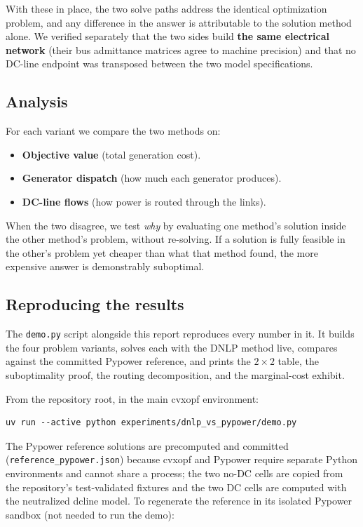 \documentclass[11pt]{article}
\begin{document}
With these in place, the two solve paths address the identical optimization
problem, and any difference in the answer is attributable to the solution method
alone. We verified separately that the two sides build \textbf{the same
electrical network} (their bus admittance matrices agree to machine precision)
and that no DC-line endpoint was transposed between the two model
specifications.

\subsection{Analysis}

For each variant we compare the two methods on:

\begin{itemize}
  \item \textbf{Objective value} (total generation cost).
  \item \textbf{Generator dispatch} (how much each generator produces).
  \item \textbf{DC-line flows} (how power is routed through the links).
\end{itemize}

When the two disagree, we test \emph{why} by evaluating one method's solution
inside the other method's problem, without re-solving. If a solution is fully
feasible in the other's problem yet cheaper than what that method found, the
more expensive answer is demonstrably suboptimal.

\subsection{Reproducing the results}

The \texttt{demo.py} script alongside this report reproduces every number in it.
It builds the four problem variants, solves each with the DNLP method live,
compares against the committed Pypower reference, and prints the $2\times2$
table, the suboptimality proof, the routing decomposition, and the marginal-cost
exhibit.

From the repository root, in the main cvxopf environment:

\begin{verbatim}
uv run --active python experiments/dnlp_vs_pypower/demo.py
\end{verbatim}

The Pypower reference solutions are precomputed and committed
(\texttt{reference\_pypower.json}) because cvxopf and Pypower require separate
Python environments and cannot share a process; the two no-DC cells are copied
from the repository's test-validated fixtures and the two DC cells are computed
with the neutralized dcline model. To regenerate the reference in its isolated
Pypower sandbox (not needed to run the demo):
\end{document}
